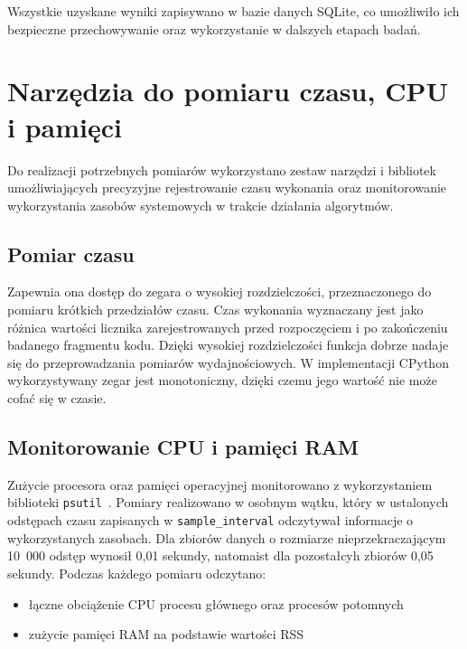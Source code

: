 Wszystkie uzyskane wyniki zapisywano w bazie danych SQLite, 
co umożliwiło ich bezpieczne przechowywanie oraz wykorzystanie w dalszych etapach badań.

\section{Narzędzia do pomiaru czasu, CPU i pamięci}
\label{sec:NarzedziaPomiaru}

Do realizacji potrzebnych pomiarów wykorzystano zestaw narzędzi i bibliotek umożliwiających 
precyzyjne rejestrowanie czasu wykonania oraz monitorowanie wykorzystania zasobów systemowych w trakcie działania algorytmów.

\subsection{Pomiar czasu}

Zapewnia ona dostęp do zegara o wysokiej rozdzielczości, przeznaczonego do pomiaru krótkich przedziałów czasu. 
Czas wykonania wyznaczany jest jako różnica wartości licznika zarejestrowanych przed rozpoczęciem i po zakończeniu
badanego fragmentu kodu. Dzięki wysokiej rozdzielczości funkcja dobrze nadaje się do przeprowadzania pomiarów wydajnościowych. 
W implementacji CPython wykorzystywany zegar jest monotoniczny, dzięki czemu jego wartość nie może cofać się w czasie.

\subsection{Monitorowanie CPU i pamięci RAM}

Zużycie procesora oraz pamięci operacyjnej monitorowano z wykorzystaniem biblioteki \texttt{psutil}~\cite{bib:Psutil}. 
Pomiary realizowano w osobnym wątku, który w ustalonych odstępach czasu zapisanych w \texttt{sample\_interval} 
odczytywał informacje o wykorzystanych zasobach.
Dla zbiorów danych o rozmiarze nieprzekraczającym 10~000 odstęp wynosił 0,01 sekundy, natomaist dla pozostałcyh zbiorów 0,05 sekundy.
Podczas każdego pomiaru odczytano:
\begin{itemize}
    \item łączne obciążenie CPU procesu głównego oraz procesów potomnych
    \item zużycie pamięci RAM na podstawie wartości RSS
\end{itemize}

